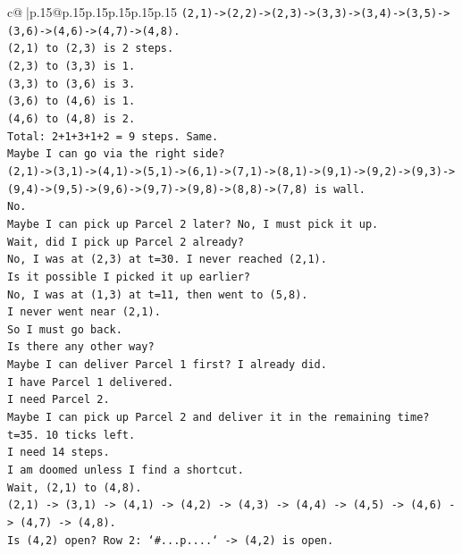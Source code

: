 \documentclass{article}
\begin{document}
{\begin{supertabular}{c@{$\;$}|p{.15\linewidth}@{}p{.15\linewidth}p{.15\linewidth}p{.15\linewidth}p{.15\linewidth}p{.15\linewidth}}
{{{\texttt{(2,1){-}>(2,2){-}>(2,3){-}>(3,3){-}>(3,4){-}>(3,5){-}>(3,6){-}>(4,6){-}>(4,7){-}>(4,8).} \\
\texttt{(2,1) to (2,3) is 2 steps.} \\
\texttt{(2,3) to (3,3) is 1.} \\
\texttt{(3,3) to (3,6) is 3.} \\
\texttt{(3,6) to (4,6) is 1.} \\
\texttt{(4,6) to (4,8) is 2.} \\
\texttt{Total: 2+1+3+1+2 = 9 steps. Same.} \\
\texttt{Maybe I can go via the right side?} \\
\texttt{(2,1){-}>(3,1){-}>(4,1){-}>(5,1){-}>(6,1){-}>(7,1){-}>(8,1){-}>(9,1){-}>(9,2){-}>(9,3){-}>(9,4){-}>(9,5){-}>(9,6){-}>(9,7){-}>(9,8){-}>(8,8){-}>(7,8) is wall.} \\
\texttt{No.} \\
\texttt{Maybe I can pick up Parcel 2 later? No, I must pick it up.} \\
\texttt{Wait, did I pick up Parcel 2 already?} \\
\texttt{No, I was at (2,3) at t=30. I never reached (2,1).} \\
\texttt{Is it possible I picked it up earlier?} \\
\texttt{No, I was at (1,3) at t=11, then went to (5,8).} \\
\texttt{I never went near (2,1).} \\
\texttt{So I must go back.} \\
\texttt{Is there any other way?} \\
\texttt{Maybe I can deliver Parcel 1 first? I already did.} \\
\texttt{I have Parcel 1 delivered.} \\
\texttt{I need Parcel 2.} \\
\texttt{Maybe I can pick up Parcel 2 and deliver it in the remaining time?} \\
\texttt{t=35. 10 ticks left.} \\
\texttt{I need 14 steps.} \\
\texttt{I am doomed unless I find a shortcut.} \\
\texttt{Wait, (2,1) to (4,8).} \\
\texttt{(2,1) {-}> (3,1) {-}> (4,1) {-}> (4,2) {-}> (4,3) {-}> (4,4) {-}> (4,5) {-}> (4,6) {-}> (4,7) {-}> (4,8).} \\
\texttt{Is (4,2) open? Row 2: `\#...p....` {-}> (4,2) is open.} \\
}}}
\end{supertabular}}
\end{document}
